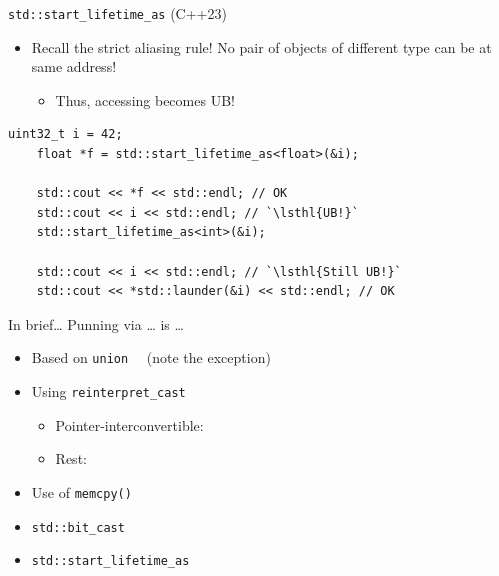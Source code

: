 \begin{frame}[fragile]{\texttt{std::start\_lifetime\_as} (C++23)}
  \begin{itemize}
  \item Recall the strict aliasing rule! No pair of objects of different type can be at same address!
    \begin{itemize}
    \item Thus, accessing  becomes UB!
    \end{itemize}
  \end{itemize}

  \pause
  \begin{lstlisting}[style=c++]
    uint32_t i = 42;
    float *f = std::start_lifetime_as<float>(&i);

    std::cout << *f << std::endl; // OK
    std::cout << i << std::endl; // `\lsthl{UB!}`
    std::start_lifetime_as<int>(&i);

    std::cout << i << std::endl; // `\lsthl{Still UB!}`
    std::cout << *std::launder(&i) << std::endl; // OK
  \end{lstlisting}
\end{frame}

\begin{frame}{In brief\ldots}
  Punning via \ldots{} is \ldots{}
  \begin{itemize}
  \item Based on \texttt{union} ~~\NotOK (note the exception)

  \item Using \texttt{reinterpret\_cast}
    \begin{itemize}
    \item Pointer-interconvertible: ~~\OK
    \item \alert{Rest:} ~~\NotOK
    \end{itemize}

  \item Use of \texttt{memcpy()} ~~\OK

  \item \texttt{std::bit\_cast} ~~\OK

  \item \texttt{std::start\_lifetime\_as} ~~\OK
  \end{itemize}
\end{frame}

